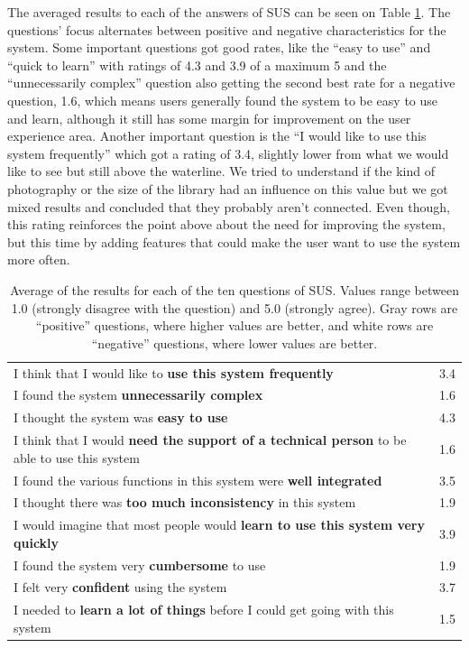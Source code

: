 The averaged results to each of the answers of \ac{SUS} can be seen on Table \ref{tab:sus}. The questions' focus alternates between positive and negative characteristics for the system. Some important questions got good rates, like the ``easy to use'' and ``quick to learn'' with ratings of 4.3 and 3.9 of a maximum 5 and the ``unnecessarily complex'' question also getting the second best rate for a negative question, 1.6, which means users generally found the system to be easy to use and learn, although it still has some margin for improvement on the user experience area. Another important question is the ``I would like to use this system frequently'' which got a rating of 3.4, slightly lower from what we would like to see but still above the waterline. We tried to understand if the kind of photography or the size of the library had an influence on this value but we got mixed results and concluded that they probably aren't connected. Even though, this rating reinforces the point above about the need for improving the system, but this time by adding features that could make the user want to use the system more often.

\vspace{\baselineskip}

\begin{table}[h!]
	\renewcommand{\arraystretch}{1.5}
	\centering
\begin{tabular}{l|c}
I think that I would like to \textbf{use this system frequently} & 3.4\\
I found the system \textbf{unnecessarily complex} & 1.6\\
I thought the system was \textbf{easy to use} & 4.3\\
I think that I would \textbf{need the support of a technical person} to be able to use this system & 1.6\\
I found the various functions in this system were \textbf{well integrated} & 3.5\\
I thought there was \textbf{too much inconsistency} in this system & 1.9\\
I would imagine that most people would \textbf{learn to use this system very quickly} & 3.9\\
I found the system very \textbf{cumbersome} to use & 1.9\\
I felt very \textbf{confident} using the system & 3.7\\
I needed to \textbf{learn a lot of things} before I could get going with this system & 1.5\\
\end{tabular}
\caption[Average of the results for each of the ten questions of \ac{SUS}.]{Average of the results for each of the ten questions of \ac{SUS}. Values range between 1.0 (strongly disagree with the question) and 5.0 (strongly agree). Gray rows are ``positive'' questions, where higher values are better, and white rows are ``negative'' questions, where lower values are better.}
\label{tab:sus}
\vspace{\baselineskip}
\end{table}





